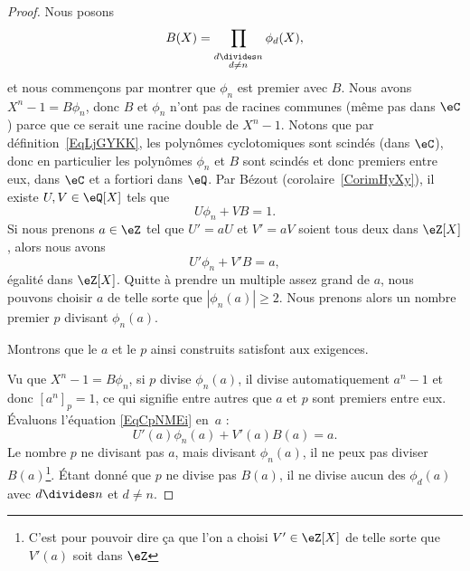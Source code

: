 \begin{proof}
    Nous posons
    \begin{equation}
        B(X)=\prod_{_{\substack{d\divides n\\d\neq n}}}\phi_d(X),
    \end{equation}
    et nous commençons par montrer que \( \phi_n\) est premier avec \( B\). Nous avons \( X^n-1=B\phi_n\), donc \( B\) et \( \phi_n\) n'ont pas de racines communes (même pas dans \( \eC\)) parce que ce serait une racine double de \( X^n-1\). Notons que par définition~\ref{EqLjGYKK}, les polynômes cyclotomiques sont scindés (dans \( \eC\)), donc en particulier les polynômes \( \phi_n\) et \( B\) sont scindés et donc premiers entre eux, dans \( \eC\) et a fortiori dans \( \eQ\). Par Bézout (corolaire~\ref{CorimHyXy}), il existe \( U,V\in\eQ[X]\) tels que
    \begin{equation}
        U\phi_n+VB=1.
    \end{equation}
    Si nous prenons \( a\in \eZ\) tel que \( U'=aU\) et \( V'=aV\) soient tous deux dans \( \eZ[X]\), alors nous avons
    \begin{equation}    \label{EqCpNMEi}
        U'\phi_n+V'B=a,
    \end{equation}
    égalité dans \( \eZ[X]\). Quitte à prendre un multiple assez grand de \( a\), nous pouvons choisir \( a\) de telle sorte que \( | \phi_n(a) |\geq 2\). Nous prenons alors un nombre premier \( p\) divisant \( \phi_n(a)\).

    Montrons que le \( a\) et le \( p\) ainsi construits satisfont aux exigences.

    Vu que \( X^n-1=B\phi_n\), si \( p\) divise \( \phi_n(a)\), il divise automatiquement \( a^n-1\) et donc \( [a^n]_p=1\), ce qui signifie entre autres que \( a\) et \( p\) sont premiers entre eux. Évaluons l'équation \eqref{EqCpNMEi} en~\( a\) :
    \begin{equation}
        U'(a)\phi_n(a)+V'(a)B(a)=a.
    \end{equation}
    Le nombre \( p\) ne divisant pas \( a\), mais divisant \( \phi_n(a)\), il ne peux pas diviser \( B(a)\)\footnote{C'est pour pouvoir dire ça que l'on a choisi \( V'\in \eZ[X]\) de telle sorte que \( V'(a)\) soit dans \( \eZ\)}. Étant donné que \( p\) ne divise pas \( B(a)\), il ne divise aucun des \( \phi_d(a)\) avec \( d\divides n\) et \( d\neq n\).


\end{proof}
